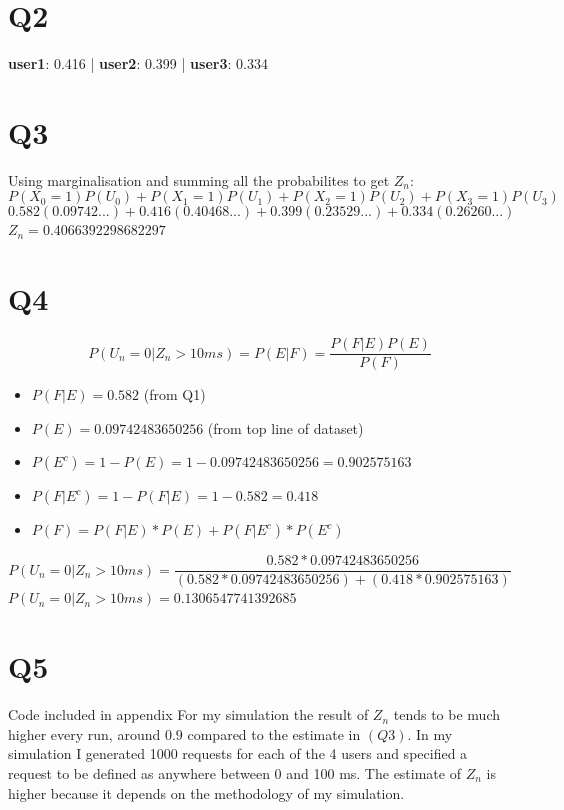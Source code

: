 \documentclass[a4paper,11pt]{article}
\theoremstyle{mytheor}
\begin{document}
\section*{Q2}
    \textbf{user1}: 0.416 | \textbf{user2}: 0.399 | \textbf{user3}: 0.334


\section*{Q3}
    Using marginalisation and summing all the probabilites to get $Z_n$:
    $$ P(X_0 = 1)P(U_0) + P(X_1 = 1)P(U_1) + P(X_2 = 1)P(U_2) + P(X_3 = 1)P(U_3) $$
    $$ 0.582(0.09742...) + 0.416(0.40468...) + 0.399(0.23529...) + 0.334(0.26260...) $$
    $ Z_n = 0.4066392298682297 $

\section*{Q4}
    $$ P(U_n=0|Z_n > 10ms) = P(E|F) = \frac{P(F|E)P(E)}{P(F)} $$
    \begin{itemize}
        \item $ P(F|E) = 0.582 $ (from Q1)
        \item $ P(E) = 0.09742483650256 $ (from top line of dataset)
        \item $ P(E^c) = 1-P(E) = 1-0.09742483650256 = 0.902575163 $
        \item $ P(F|E^c) = 1-P(F|E) = 1-0.582 = 0.418 $
        \item $ P(F) = P(F|E)*P(E) + P(F|E^c)*P(E^c) $
    \end{itemize}

    $$ P(U_n=0|Z_n > 10ms) = \frac{0.582 * 0.09742483650256}{(0.582 * 0.09742483650256)+(0.418*0.902575163)} $$
    $ P(U_n=0|Z_n > 10ms) = 0.1306547741392685 $

\section*{Q5}
    Code included in appendix
    For my simulation the result of $Z_n$ tends to be much higher every run,
    around $0.9$ compared to the estimate in $(Q3)$. In my simulation I generated 1000 requests
    for each of the 4 users and specified a request to be defined as 
    anywhere between 0 and 100 ms. The estimate of $Z_n$ is higher because it depends
    on the methodology of my simulation. 

\newpage
\end{document}
